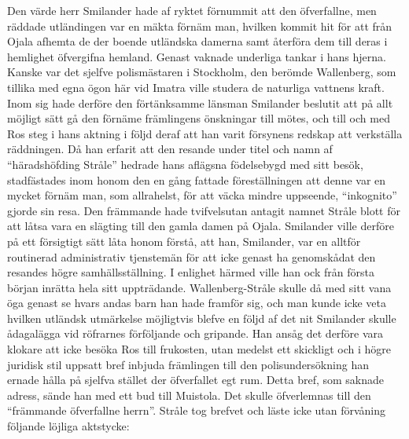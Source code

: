 Den värde herr Smilander hade af ryktet förnummit att den öfverfallne,
men räddade utländingen var en mäkta förnäm man, hvilken kommit hit för
att från Ojala afhemta de der boende utländska damerna samt återföra dem
till deras i hemlighet öfvergifna hemland. Genast vaknade underliga
tankar i hans hjerna. Kanske var det sjelfve polismästaren i Stockholm,
den berömde Wallenberg, som tillika med egna ögon här vid Imatra ville
studera de naturliga vattnens kraft. Inom sig hade derföre den
förtänksamme länsman Smilander beslutit att på allt möjligt sätt gå den
förnäme främlingens önskningar till mötes, och till och med Ros steg i
hans aktning i följd deraf att han varit försynens redskap att
verkställa räddningen. Då han erfarit att den resande under titel och
namn af ``häradshöfding Stråle'' hedrade hans aflägsna födelsebygd med
sitt besök, stadfästades inom honom den en gång fattade föreställningen
att denne var en mycket förnäm man, som allrahelst, för att väcka mindre
uppseende, ``inkognito'' gjorde sin resa. Den främmande hade
tvifvelsutan antagit namnet Stråle blott för att låtsa vara en slägting
till den gamla damen på Ojala. Smilander ville derföre på ett försigtigt
sätt låta honom förstå, att han, Smilander, var en alltför routinerad
administrativ tjenstemän för att icke genast ha genomskådat den resandes
högre samhällsställning. I enlighet härmed ville han ock från första
början inrätta hela sitt uppträdande. Wallenberg-Stråle skulle då med
sitt vana öga genast se hvars andas barn han hade framför sig, och man
kunde icke veta hvilken utländsk utmärkelse möjligtvis blefve en följd
af det nit Smilander skulle ådagalägga vid röfrarnes förföljande och
gripande. Han ansåg det derföre vara klokare att icke besöka Ros till
frukosten, utan medelst ett skickligt och i högre juridisk stil uppsatt
bref inbjuda främlingen till den polisundersökning han ernade hålla på
sjelfva stället der öfverfallet egt rum. Detta bref, som saknade adress,
sände han med ett bud till Muistola. Det skulle öfverlemnas till den
``främmande öfverfallne herrn''. Stråle tog brefvet och läste icke utan
förvåning följande löjliga aktstycke:

